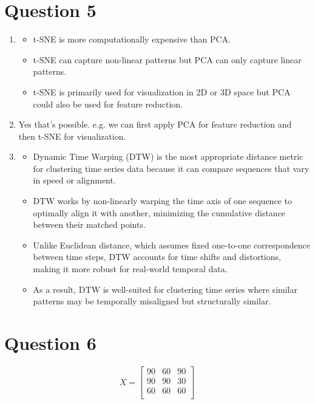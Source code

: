 \documentclass[a4paper,12pt]{article}
\begin{document}
\section*{Question 5}
\begin{enumerate}[label=\alph*)]
    \item 
    \begin{itemize}
        \item t-SNE is more computationally expensive than PCA.
        \item t-SNE can capture non-linear patterns but PCA can only capture linear patterns.
        \item t-SNE is primarily used for visualization in 2D or 3D space but PCA could also be used for feature reduction.
    \end{itemize}

    \item Yes that's possible. e.g. we can first apply PCA for feature reduction and then t-SNE for visualization.
    \item \begin{itemize}
        \item Dynamic Time Warping (DTW) is the most appropriate distance metric for clustering time series data because it can compare sequences that vary in speed or alignment.
        \item DTW works by non-linearly warping the time axis of one sequence to optimally align it with another, minimizing the cumulative distance between their matched points.
        \item Unlike Euclidean distance, which assumes fixed one-to-one correspondence between time steps, DTW accounts for time shifts and distortions, making it more robust for real-world temporal data.
        \item As a result, DTW is well-suited for clustering time series where similar patterns may be temporally misaligned but structurally similar.
    \end{itemize} 
\end{enumerate}

\section*{Question 6}
\[
X = 
\begin{bmatrix}
90 & 60 & 90 \\
90 & 90 & 30 \\
60 & 60 & 60 \\
\end{bmatrix}
\]
\end{document}

